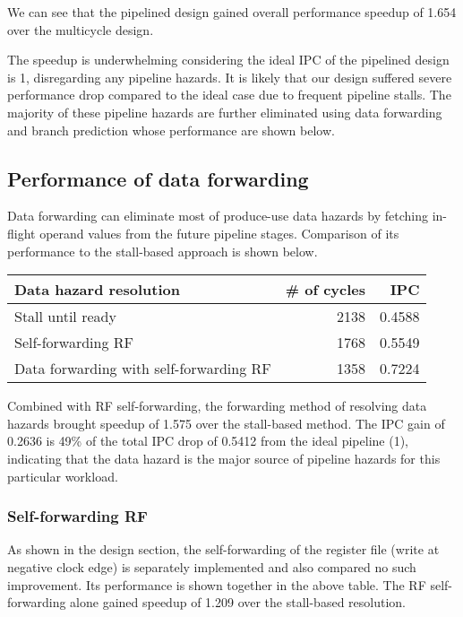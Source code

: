 \documentclass[12pt]{article}
\begin{document}
We can see that the pipelined design gained overall performance
speedup of 1.654 over the multicycle design.

The speedup is underwhelming considering the ideal IPC of the
pipelined design is 1, disregarding any pipeline hazards.  It is
likely that our design suffered severe performance drop compared to
the ideal case due to frequent pipeline stalls.  The majority of these
pipeline hazards are further eliminated using data forwarding and
branch prediction whose performance are shown below.

\subsection{Performance of data forwarding}
Data forwarding can eliminate most of produce-use data hazards by
fetching in-flight operand values from the future pipeline stages.
Comparison of its performance to the stall-based approach is shown
below.

\begin{table}[ht]
  \centering
  \begin{tabular}{@{}lrr@{}} \toprule
    Data hazard resolution & \# of cycles & IPC \\ \midrule
    Stall until ready & 2138 & 0.4588 \\
    Self-forwarding RF & 1768 & 0.5549 \\
    Data forwarding with self-forwarding RF & 1358 & 0.7224 \\ \bottomrule
  \end{tabular}
\end{table}

Combined with RF self-forwarding, the forwarding method of resolving
data hazards brought speedup of 1.575 over the stall-based method.
The IPC gain of 0.2636 is 49\% of the total IPC drop of 0.5412 from
the ideal pipeline (1), indicating that the data hazard is the major
source of pipeline hazards for this particular workload.

\subsubsection{Self-forwarding RF}
As shown in the design section, the self-forwarding of the register
file (write at negative clock edge) is separately implemented and also
compared no such improvement.  Its performance is shown together in
the above table.  The RF self-forwarding alone gained speedup of 1.209
over the stall-based resolution.
\end{document}
